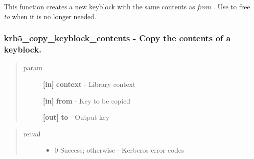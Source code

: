 \documentclass[letterpaper,10pt,english]{sphinxmanual}
\begin{document}
This function creates a new keyblock with the same contents as \emph{from} . Use {\hyperref[appdev/refs/api/krb5_free_keyblock:krb5_free_keyblock]{}} to free \emph{to} when it is no longer needed.


\subsubsection{krb5\_copy\_keyblock\_contents -  Copy the contents of a keyblock.}
\label{appdev/refs/api/krb5_copy_keyblock_contents:krb5-copy-keyblock-contents-copy-the-contents-of-a-keyblock}\label{appdev/refs/api/krb5_copy_keyblock_contents::doc}

\begin{fulllineitems}
\label{appdev/refs/api/krb5_copy_keyblock_contents:krb5_copy_keyblock_contents}
\end{fulllineitems}

\begin{quote}\begin{description}
\item[{param}] \leavevmode
\textbf{{[}in{]}} \textbf{context} - Library context

\textbf{{[}in{]}} \textbf{from} - Key to be copied

\textbf{{[}out{]}} \textbf{to} - Output key

\end{description}\end{quote}
\begin{quote}\begin{description}
\item[{retval}] \leavevmode\begin{itemize}
\item {} 
0   Success; otherwise - Kerberos error codes

\end{itemize}

\end{description}\end{quote}
\end{document}
